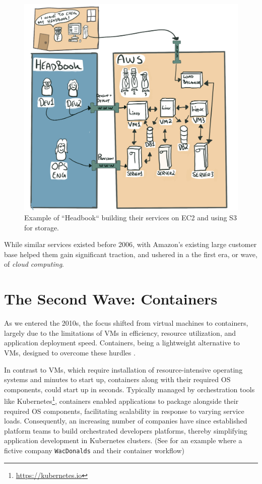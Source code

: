 \documentclass[
  table]{report}
\begin{document}
\begin{figure}[H]
\centering
  \includegraphics[width=0.7\columnwidth]{assets/aws-wave.jpg}
  \caption{Example of ``Headbook`` building their services on EC2 and using S3
for storage.}
  \label{fig:headbook}
\end{figure}

While similar services existed before 2006, with Amazon's existing large
customer base helped them gain significant traction, and ushered in a
the first era, or wave, of \emph{cloud computing}.

\section{The Second Wave: Containers}
\label{sect:second-wave}

As we entered the 2010s, the focus shifted from virtual machines to
containers, largely due to the limitations of VMs in efficiency,
resource utilization, and application deployment speed. Containers,
being a lightweight alternative to VMs, designed to overcome these
hurdles \citep{bao2016}.

In contrast to VMs, which require installation of resource-intensive
operating systems and minutes to start up, containers along with their
required OS components, could start up in seconds. Typically managed by
orchestration tools like Kubernetes\footnote{\url{https://kubernetes.io}},
containers enabled applications to package alongside their required OS
components, facilitating scalability in response to varying service
loads. Consequently, an increasing number of companies have since
established platform teams to build orchestrated developers platforms,
thereby simplifying application development in Kubernetes clusters. (See
 for an example where a fictive company
\texttt{WacDonalds} and their container workflow)
\end{document}

